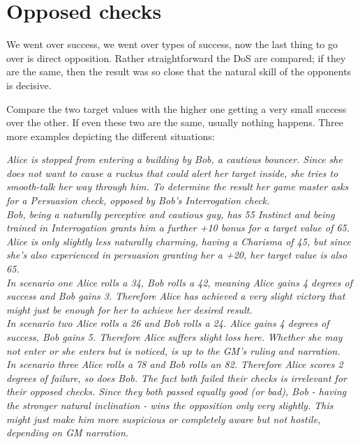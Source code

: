 \documentclass[12pt,a4paper,openany,usenames,dvipsnames]{book}
\begin{document}
	\section{Opposed checks}
	\label{sec:opposedchecks}
	We went over success, we went over types of success, now the last thing to go over is direct opposition. Rather straightforward the DoS are compared; if they are the same, then the result was so close that the natural skill of the opponents is decisive.
	\par
	\pagebreak %
	Compare the two target values with the higher one getting a very small success over the other. If even these two are the same, usually nothing happens. Three more examples depicting the different situations:
	\begin{exampleblock}\textit{
	Alice is stopped from entering a building by Bob, a cautious bouncer. Since she does not want to cause a ruckus that could alert her target inside, she tries to smooth-talk her way through him. To determine the result her game master asks for a Persuasion check, opposed by Bob’s Interrogation check.\\
	Bob, being a naturally perceptive and cautious guy, has 55 Instinct and being trained in Interrogation grants him a further +10 bonus for a target value of \emph{65}. Alice is only slightly less naturally charming, having a Charisma of 45, but since she’s also experienced in persuasion granting her a +20, her target value is also \emph{65}.\\
	In scenario one Alice rolls a 34, Bob rolls a 42, meaning Alice gains 4 degrees of success and Bob gains 3. Therefore Alice has achieved a very slight victory that might just be enough for her to achieve her desired result.\\
	In scenario two Alice rolls a 26 and Bob rolls a 24. Alice gains 4 degrees of success, Bob gains 5. Therefore Alice suffers slight loss here. Whether she may not enter or she enters but is noticed, is up to the GM’s ruling and narration.\\
	In scenario three Alice rolls a 78 and Bob rolls an 82. Therefore Alice scores 2 degrees of failure, so does Bob. The fact both failed their checks is irrelevant for their opposed checks. Since they both passed equally good (or bad), Bob - having the stronger natural inclination - wins the opposition only very slightly. This might just make him more suspicious or completely aware but not hostile, depending on GM narration.\\
		}
	\end{exampleblock}
\end{document}
